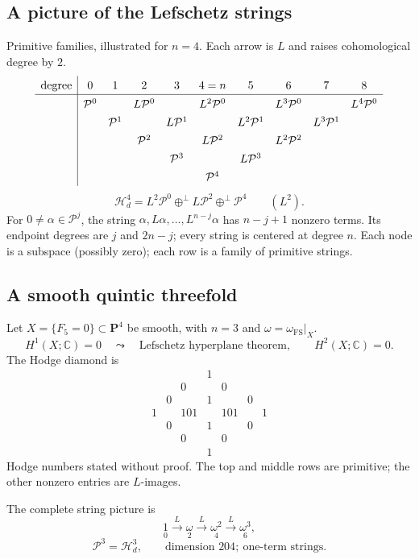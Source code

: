 \documentclass[11pt]{article}
\newcommand{\C}{\mathbb C}
\newcommand{\Hd}{\mathcal H_d}
\newcommand{\Prim}{\mathcal P}
\newcommand{\orthsum}{\mathbin{\oplus^{\perp}}}
\begin{document}
\subsection*{A picture of the Lefschetz strings}
Primitive families, illustrated for $n=4$.
Each arrow is $L$ and raises cohomological degree by $2$.
\[
\renewcommand{\arraystretch}{1.35}
\begin{array}{c|ccccccccc}
\text{degree}&0&1&2&3&4=n&5&6&7&8\\\hline
 &\Prim^0&&L\Prim^0&&L^2\Prim^0&&L^3\Prim^0&&L^4\Prim^0\\
 &&\Prim^1&&L\Prim^1&&L^2\Prim^1&&L^3\Prim^1&\\
 &&&\Prim^2&&L\Prim^2&&L^2\Prim^2&&\\
 &&&&\Prim^3&&L\Prim^3&&&\\
 &&&&&\Prim^4&&&&
\end{array}
\]
\[
 \Hd^4=L^2\Prim^0\orthsum L\Prim^2\orthsum\Prim^4
 \qquad(L^2).
\]
For $0\neq\alpha\in\Prim^j$, the string
$\alpha,L\alpha,\ldots,L^{n-j}\alpha$ has $n-j+1$ nonzero terms.
Its endpoint degrees are $j$ and $2n-j$; every string is centered at
degree $n$. Each node is a subspace (possibly zero); each row is a
family of primitive strings.

\subsection*{A smooth quintic threefold}
Let $X=\{F_5=0\}\subset\mathbf P^4$ be smooth, with $n=3$ and
$\omega=\omega_{\mathrm{FS}}|_X$.
\[
 H^1(X;\C)=0\quad\leadsto\quad\text{Lefschetz hyperplane theorem},
 \qquad H^2(X;\C)=0.
\]
The Hodge diamond is
\[
\begin{array}{ccccccc}
 &&&1&&&\\
 &&0&&0&&\\
 &0&&1&&0&\\
 1&&101&&101&&1\\
 &0&&1&&0&\\
 &&0&&0&&\\
 &&&1&&&
\end{array}
\]
Hodge numbers stated without proof. The top and middle rows are
primitive; the other nonzero entries are $L$-images.

The complete string picture is
\[
 \underset{0}{1}\xrightarrow{L}
 \underset{2}{\omega}\xrightarrow{L}
 \underset{4}{\omega^2}\xrightarrow{L}
 \underset{6}{\omega^3},
\]
\[
 \Prim^3=\Hd^3,\qquad\text{dimension }204;\ \text{one-term strings}.
\]
\end{document}
